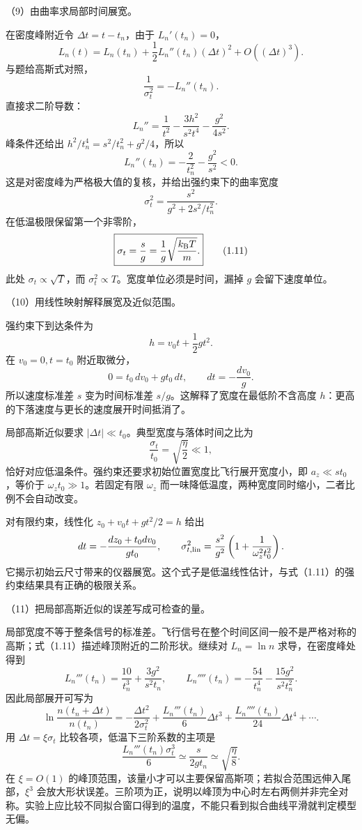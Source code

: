 \documentclass[12pt,a4paper,fontset=fandol]{ctexart}
\begin{document}
（9）由曲率求局部时间展宽。

在密度峰附近令 \(\Delta t=t-t_n\)，由于 \(L_n'(t_n)=0\)， \[
L_n(t)=L_n(t_n)+\frac12L_n''(t_n)(\Delta t)^2
+O((\Delta t)^3).
\] 与题给高斯式对照， \[
\frac1{\sigma_t^2}=-L_n''(t_n).
\] 直接求二阶导数： \[
L_n''=\frac1{t^2}-\frac{3h^2}{s^2t^4}
-\frac{g^2}{4s^2}.
\] 峰条件还给出 \(h^2/t_n^4=s^2/t_n^2+g^2/4\)，所以 \[
L_n''(t_n)=-\frac2{t_n^2}-\frac{g^2}{s^2}<0.
\] 这是对密度峰为严格极大值的复核，并给出强约束下的曲率宽度 \[
\sigma_t^2=\frac{s^2}{g^2+2s^2/t_n^2}.
\] 在低温极限保留第一个非零阶， \[
\boxed{\sigma_t=\frac{s}{g}
=\frac1g\sqrt{\frac{k_{\rm B}T}{m}}.}\tag{1.11}
\] 此处 \(\sigma_t\propto\sqrt T\)，而
\(\sigma_t^2\propto T\)。宽度单位必须是时间，漏掉 \(g\) 会留下速度单位。

（10）用线性映射解释展宽及近似范围。

强约束下到达条件为 \[
h=v_0t+\frac12gt^2.
\] 在 \(v_0=0,t=t_0\) 附近取微分， \[
0=t_0\,dv_0+gt_0\,dt,\qquad dt=-\frac{dv_0}{g}.
\] 所以速度标准差 \(s\) 变为时间标准差
\(s/g\)。这解释了宽度在最低阶不含高度
\(h\)：更高的下落速度与更长的速度展开时间抵消了。

局部高斯近似要求 \(|\Delta t|\ll t_0\)。典型宽度与落体时间之比为 \[
\frac{\sigma_t}{t_0}=\sqrt{\frac{\eta}{2}}\ll1,
\] 恰好对应低温条件。强约束还要求初始位置宽度比飞行展开宽度小，即
\(a_z\ll st_0\)，等价于 \(\omega_z t_0\gg1\)。若固定有限 \(\omega_z\)
而一味降低温度，两种宽度同时缩小，二者比例不会自动改变。

对有限约束，线性化 \(z_0+v_0t+gt^2/2=h\) 给出 \[
dt=-\frac{dz_0+t_0dv_0}{gt_0},\qquad
\sigma_{t,\rm lin}^2=\frac{s^2}{g^2}
\left(1+\frac1{\omega_z^2t_0^2}\right).
\]
它揭示初始云尺寸带来的仪器展宽。这个式子是低温线性估计，与式（1.11）的强约束结果具有正确的极限关系。

（11）把局部高斯近似的误差写成可检查的量。

局部宽度不等于整条信号的标准差。飞行信号在整个时间区间一般不是严格对称的高斯；式（1.11）描述峰顶附近的二阶形状。继续对
\(L_n=\ln n\) 求导，在密度峰处得到 \[
L_n'''(t_n)=\frac{10}{t_n^3}+\frac{3g^2}{s^2t_n},
\qquad
L_n''''(t_n)=-\frac{54}{t_n^4}-\frac{15g^2}{s^2t_n^2}.
\] 因此局部展开可写为 \[
\ln\frac{n(t_n+\Delta t)}{n(t_n)}
=-\frac{\Delta t^2}{2\sigma_t^2}
+\frac{L_n'''(t_n)}6\Delta t^3
+\frac{L_n''''(t_n)}{24}\Delta t^4+\cdots.
\] 用 \(\Delta t=\xi\sigma_t\) 比较各项，低温下三阶系数的主项是 \[
\frac{L_n'''(t_n)\sigma_t^3}{6}
\simeq\frac{s}{2gt_n}
\simeq\sqrt{\frac\eta8}.
\] 在 \(\xi=O(1)\)
的峰顶范围，该量小才可以主要保留高斯项；若拟合范围远伸入尾部，\(\xi^3\)
会放大形状误差。三阶项为正，说明以峰顶为中心时左右两侧并非完全对称。实验上应比较不同拟合窗口得到的温度，不能只看到拟合曲线平滑就判定模型无偏。
\end{document}
